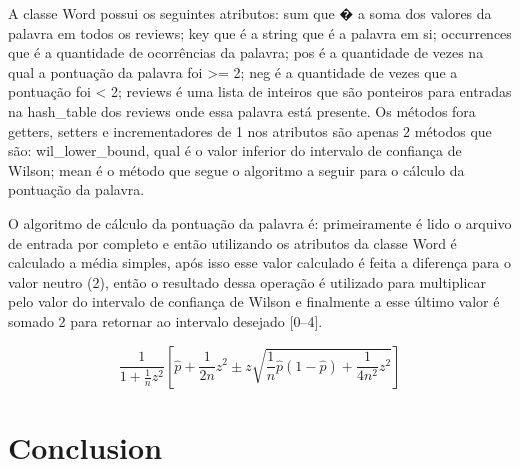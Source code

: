 \documentclass[12pt]{article}
\begin{document}
A classe Word possui os seguintes atributos: sum que � a soma dos valores da palavra em todos os
reviews; key que é a string que é a palavra em si; occurrences que é a quantidade de ocorrências da
palavra; pos é a quantidade de vezes na qual a pontuação da palavra foi >= 2; neg é a quantidade de
vezes que a pontuação foi < 2; reviews é uma lista de inteiros que são ponteiros para entradas na
hash\_table dos reviews onde essa palavra está presente. Os métodos fora getters, setters e
incrementadores de 1 nos atributos são apenas 2 métodos que são: wil\_lower\_bound, qual é o valor
inferior do intervalo de confiança de Wilson; mean é o método que segue o algoritmo a seguir para o
cálculo da pontuação da palavra.

O algoritmo de cálculo da pontuação da palavra é: primeiramente é lido o arquivo de entrada por
completo e então utilizando os atributos da classe Word é calculado a média simples, após isso esse
valor calculado é feita a diferença para o valor neutro (2), então o resultado dessa operação é
utilizado para multiplicar pelo valor do intervalo de confiança de Wilson e finalmente a esse último
valor é somado 2 para retornar ao intervalo desejado [0--4].

$$ \frac{1}{1+\frac{1}{n}z^2}\left [ \hat{p} + \frac{1}{2n}z^2 \pm z \sqrt{\frac{1}{n} \hat{p}
   \left ( 1 - \hat{p} \right ) + \frac{1}{4n^2} z^2} \right ] $$

\section{Conclusion}
\end{document}
